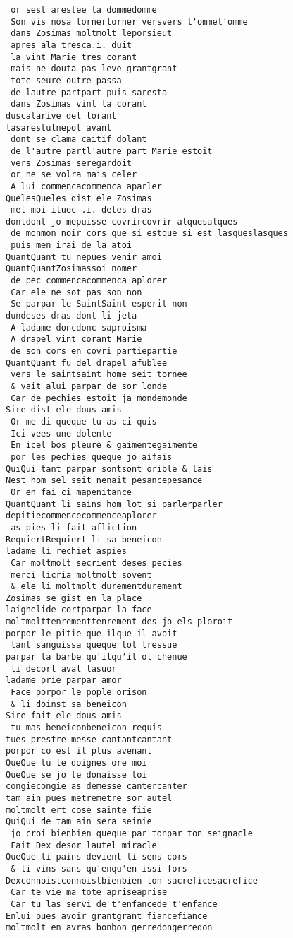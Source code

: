 \documentclass[
  letterpaper,
  DIV=11,
  numbers=noendperiod]{scrreprt}
\begin{document}
\begin{verbatim}
 or sest arestee la dommedomme
 Son vis nosa tornertorner versvers l'ommel'omme
 dans Zosimas moltmolt leporsieut
 apres ala tresca.i. duit
 la vint Marie tres corant
 mais ne douta pas leve grantgrant
 tote seure outre passa
 de lautre partpart puis saresta
 dans Zosimas vint la corant
duscalarive del torant
lasarestutnepot avant
 dont se clama caitif dolant
 de l'autre partl'autre part Marie estoit
 vers Zosimas seregardoit
 or ne se volra mais celer
 A lui commencacommenca aparler
QuelesQueles dist ele Zosimas
 met moi iluec .i. detes dras
dontdont jo mepuisse covrircovrir alquesalques
 de monmon noir cors que si estque si est lasqueslasques
 puis men irai de la atoi
QuantQuant tu nepues venir amoi
QuantQuantZosimassoi nomer
 de pec commencacommenca aplorer
 Car ele ne sot pas son non
 Se parpar le SaintSaint esperit non
dundeses dras dont li jeta
 A ladame doncdonc saproisma
 A drapel vint corant Marie
 de son cors en covri partiepartie
QuantQuant fu del drapel afublee
 vers le saintsaint home seit tornee
 & vait alui parpar de sor londe
 Car de pechies estoit ja mondemonde
Sire dist ele dous amis
 Or me di queque tu as ci quis
 Ici vees une dolente
 En icel bos pleure & gaimentegaimente
 por les pechies queque jo aifais
QuiQui tant parpar sontsont orible & lais
Nest hom sel seit nenait pesancepesance
 Or en fai ci mapenitance
QuantQuant li sains hom lot si parlerparler
depitiecommencecommenceaplorer
 as pies li fait afliction
RequiertRequiert li sa beneicon
ladame li rechiet aspies
 Car moltmolt secrient deses pecies
 merci licria moltmolt sovent
 & ele li moltmolt durementdurement
Zosimas se gist en la place
laighelide cortparpar la face
moltmolttenrementtenrement des jo els ploroit
porpor le pitie que ilque il avoit
 tant sanguissa queque tot tressue
parpar la barbe qu'ilqu'il ot chenue
 li decort aval lasuor
ladame prie parpar amor
 Face porpor le pople orison
 & li doinst sa beneicon
Sire fait ele dous amis
 tu mas beneiconbeneicon requis
tues prestre messe cantantcantant
porpor co est il plus avenant
QueQue tu le doignes ore moi
QueQue se jo le donaisse toi
congiecongie as demesse cantercanter
tam ain pues metremetre sor autel
moltmolt ert cose sainte fiie
QuiQui de tam ain sera seinie
 jo croi bienbien queque par tonpar ton seignacle
 Fait Dex desor lautel miracle
QueQue li pains devient li sens cors
 & li vins sans qu'enqu'en issi fors
Dexconnoistconnoistbienbien ton sacreficesacrefice
 Car te vie ma tote apriseaprise
 Car tu las servi de t'enfancede t'enfance
Enlui pues avoir grantgrant fiancefiance
moltmolt en avras bonbon gerredongerredon

\end{verbatim}
\end{document}
